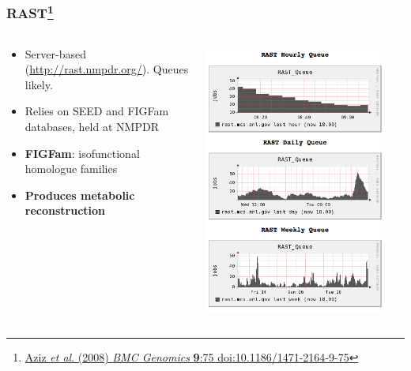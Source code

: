 \begin{frame}
  \frametitle{RAST\footnote{\tiny{\href{http://dx.doi.org/10.1186/1471-2164-9-75}{Aziz \textit{et al}. (2008) \textit{BMC Genomics} \textbf{9}:75 doi:10.1186/1471-2164-9-75}}}}
  \begin{columns}
    \begin{column}{5cm}
      \begin{itemize}
        \item Server-based (\href{http://rast.nmpdr.org/}{http://rast.nmpdr.org/}). Queues likely.
        \item Relies on SEED and FIGFam databases, held at NMPDR
        \item \textbf{FIGFam}: isofunctional homologue families
        \item \textbf{Produces metabolic reconstruction}
      \end{itemize}
    \end{column}
    \begin{column}{5cm}
      \includegraphics[width=0.9\textwidth]{images/rast_queue}
    \end{column}
  \end{columns}
\end{frame}
